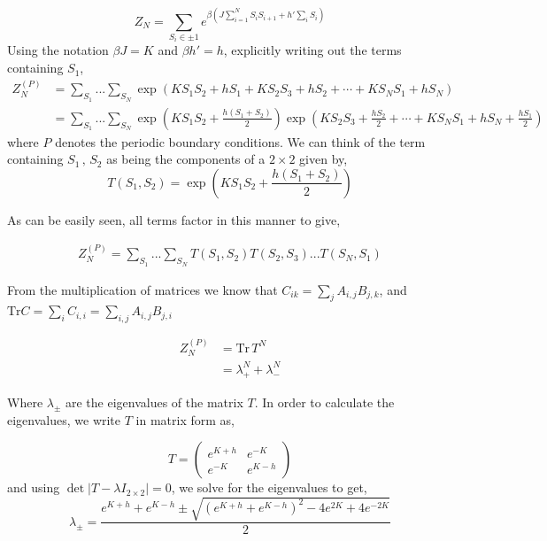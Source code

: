 \documentclass[11pt,a4paper]{article}
\newcommand{\Tr}{\text{Tr}}
\begin{document}
\begin{equation*}
    Z_N = \sum_{S_i \in \pm 1} e^{\beta \left (J \sum^N_{i=1} S_i S_{i+1} + h' \sum_i S_i \right)}
\end{equation*}
Using the notation $\beta J = K$ and $\beta h' = h$, explicitly writing out the terms containing $S_1$,
\begin{align}
  Z^{(P)}_N &= \sum_{S_1}...\sum_{S_N} \exp \left( K S_1 S_2 + h S_1 + K S_2 S_3 + h S_2 + \cdots + K S_N S_1 + h S_N \right) \nonumber \\
  &= \sum_{S_1}...\sum_{S_N} \exp {\left( K S_1 S_2 + \frac{h (S_1 + S_2)}{2}\right)} \exp {\left(K S_2 S_3 + \frac{h S_2}{2} + \cdots + K S_N S_1 + h S_N + \frac{h S_1}{2} \right)}
\end{align}
where $P$ denotes the periodic boundary conditions. We can think of the term containing $S_1 \,,\, S_2$ as being the components of a $2 \times 2$ given by,
\begin{equation}
    T(S_1, S_2) = \exp \left( K S_1 S_2 + \frac{h (S_1 + S_2)}{2} \right)
\end{equation}

As can be easily seen, all terms factor in this manner to give,

\begin{align}
    Z^{(P)}_N = \sum_{S_1}...\sum_{S_N} T(S_1,S_2) T(S_2, S_3) ... T(S_N, S_1)
\end{align}

From the multiplication of matrices we know that $C_{i k} = \sum_j A_{i,j} B_{j,k}$, and $\Tr C = \sum_i C_{i,i} = \sum_{i,j} A_{i,j}B_{j,i}$

\begin{align}
    Z^{(P)}_N &= \text{Tr} \, T^N \nonumber \\
    &= \lambda^N_+ + \lambda^N_-
\end{align}

Where $\lambda_{\pm}$ are the eigenvalues of the matrix $T$. In order to calculate the eigenvalues, we write $T$ in matrix form as,

\begin{equation*}
 T = \begin{pmatrix}
e^{K + h} & e^{-K} \\
e^{-K} & e^{K - h}
\end{pmatrix}   
\end{equation*}
and using $\det |T - \lambda I_{2\times2} | = 0$, we solve for the eigenvalues to get,
\begin{equation}
    \lambda_{\pm} = \frac{e^{K + h} + e^{K - h} \pm \sqrt{(e^{K + h} + e^{K - h})^2 - 4 e^{2K} + 4 e^{-2K}}}{2}
\end{equation}
\end{document}
